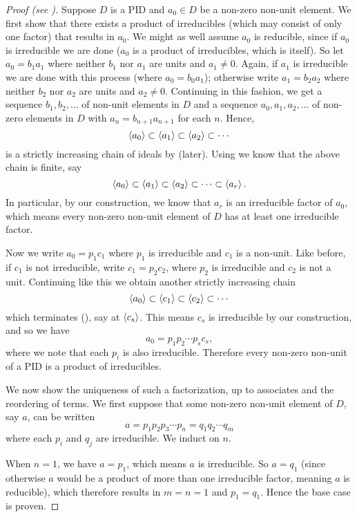 \begin{proof}[Proof (see {\cite[Theorem 18.3]{gallian_2016}})]
    Suppose $D$ is a PID and $a_0 \in D$ be a non-zero non-unit element. We first show that there exists a product of irreducibles (which may consist of only one factor) that results in $a_0$. We might as well assume $a_0$ is reducible, since if $a_0$ is irreducible we are done ($a_0$ is a product of irreducibles, which is itself). So let $a_0 = b_1a_1$ where neither $b_1$ nor $a_1$ are units and $a_1 \neq 0$. Again, if $a_1$ is irreducible we are done with this process (where $a_0 = b_0a_1$); otherwise write $a_1 = b_2a_2$ where neither $b_2$ nor $a_2$ are units and $a_2 \neq 0$. Continuing in this fashion, we get a sequence $b_1,b_2,\dots$ of non-unit elements in $D$ and a sequence $a_0,a_1,a_2,\dots$ of non-zero elements in $D$ with $a_n = b_{n+1}a_{n+1}$ for each $n$. Hence,
    \[
        \left\langle a_0\right\rangle \subset \left\langle a_1\right\rangle \subset \left\langle a_2\right\rangle \subset \cdots
    \]
    is a strictly increasing chain of ideals by  (later). Using  we know that the above chain is finite, say
    \[
        \left\langle a_0\right\rangle \subset \left\langle a_1\right\rangle \subset \left\langle a_2\right\rangle \subset \cdots \subset \left\langle a_r\right\rangle.
    \]
    In particular, by our construction, we know that $a_r$ is an irreducible factor of $a_0$, which means every non-zero non-unit element of $D$ has at least one irreducible factor.

    Now we write $a_0 = p_1c_1$ where $p_1$ is irreducible and $c_1$ is a non-unit. Like before, if $c_1$ is not irreducible, write $c_1 = p_2c_2$, where $p_2$ is irreducible and $c_2$ is not a unit. Continuing like this we obtain another strictly increasing chain
    \[
        \left\langle a_0\right\rangle \subset \left\langle c_1\right\rangle \subset \left\langle c_2\right\rangle \subset \cdots
    \]
    which terminates (), say at $\left\langle c_s\right\rangle$. This means $c_s$ is irreducible by our construction, and so we have
    \[
        a_0 = p_1p_2\cdots p_sc_s,
    \]
    where we note that each $p_i$ is also irreducible. Therefore every non-zero non-unit of a PID is a product of irreducibles.

    We now show the uniqueness of such a factorization, up to associates and the reordering of terms. We first suppose that some non-zero non-unit element of $D$, say $a$, can be written
    \[
        a = p_1p_2p_3\cdots p_n = q_1q_2 \cdots q_m
    \]
    where each $p_i$ and $q_j$ are irreducible. We induct on $n$.

    When $n = 1$, we have $a = p_1$, which means $a$ is irreducible. So $a = q_1$ (since otherwise $a$ would be a product of more than one irreducible factor, meaning $a$ is reducible), which therefore results in $m = n = 1$ and $p_1 = q_1$. Hence the base case is proven.


\end{proof}
